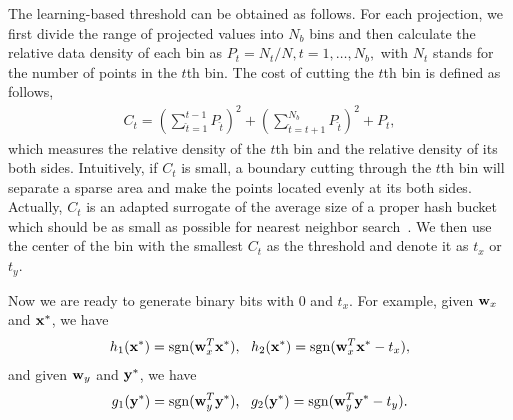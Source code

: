 The learning-based threshold can be obtained as follows. For each projection, we first divide the range of projected values into $ N_b $ bins and then calculate the relative data density of each bin as $ P_{t} = N_t/N, t=1,\dots,N_b, $ with $ N_t $ stands for the number of points in the $ t $th bin. The cost of cutting the $ t $th bin is defined as follows,
\begin{align}
C_t = \left(\sum\nolimits_{\hat{t}=1}^{t-1}P_{\hat{t}}\right)^2 +   \left(\sum\nolimits_{\hat{t}=t+1}^{N_b}P_{\hat{t}}\right)^2 + P_t,\nonumber
\end{align}
which measures the relative density of the $ t $th bin and the relative density of its both sides. Intuitively, if $ C_{t} $ is small, a boundary cutting through the $ t $th bin will separate a sparse area and make the points located evenly at its both sides. Actually, $ C_t $ is an adapted surrogate of the average size of a proper hash bucket which should be as small as possible for nearest neighbor search~\cite{cayton2007nips}. We then use the center of the bin with the smallest $ C_t $ as the threshold and denote it as $ t_x $ or $ t_y $.

Now we are ready to generate binary bits with 0 and $ t_x $. For example, given $ {\bf w}_x $ and $ {\bf x}^{*} $, we have
\begin{align}
\label{eqn:csmh:hg1}
h_1({\bf x}^{*}) = \mathop{\rm sgn}({\bf w}_{x}^{T}{\bf x}^{*}), \ \ h_2({\bf x}^{*}) = \mathop{\rm sgn}({\bf w}_{x}^{T}{\bf x}^{*}-t_x),
\end{align}
and given $ {\bf w}_y $ and $ {\bf y}^{*} $, we have
\begin{align}
\label{eqn:csmh:hg2}
g_1({\bf y}^{*}) = \mathop{\rm sgn}({\bf w}_{y}^{T}{\bf y}^{*}), \ \ g_2({\bf y}^{*}) = \mathop{\rm sgn}({\bf w}_{y}^{T}{\bf y}^{*}-t_y).
\end{align}



%

